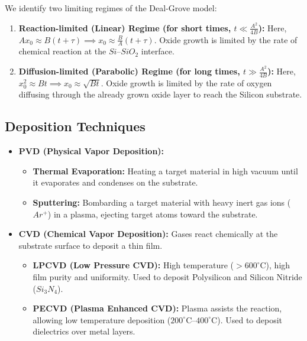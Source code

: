 \documentclass[12pt,a4paper]{article}
\begin{document}
We identify two limiting regimes of the Deal-Grove model:
\begin{enumerate}[leftmargin=*, label=\arabic*., itemsep=3.5pt]
  \item \textbf{Reaction-limited (Linear) Regime (for short times, $t \ll \frac{A^2}{4B}$):}
  Here, $A x_0 \approx B(t + \tau) \implies x_0 \approx \frac{B}{A}(t + \tau)$.
  Oxide growth is limited by the rate of chemical reaction at the $Si$--$SiO_2$ interface.
  \item \textbf{Diffusion-limited (Parabolic) Regime (for long times, $t \gg \frac{A^2}{4B}$):}
  Here, $x_0^2 \approx B t \implies x_0 \approx \sqrt{B t}$.
  Oxide growth is limited by the rate of oxygen diffusing through the already grown oxide layer to reach the Silicon substrate.
\end{enumerate}

\subsection{Deposition Techniques}
\begin{itemize}[leftmargin=*, itemsep=4pt]
  \item \textbf{PVD (Physical Vapor Deposition):}
    \begin{itemize}[leftmargin=*, itemsep=2pt]
      \item \textbf{Thermal Evaporation:} Heating a target material in high vacuum until it evaporates and condenses on the substrate.
      \item \textbf{Sputtering:} Bombarding a target material with heavy inert gas ions ($Ar^+$) in a plasma, ejecting target atoms toward the substrate.
    \end{itemize}
  \item \textbf{CVD (Chemical Vapor Deposition):} Gases react chemically at the substrate surface to deposit a thin film.
    \begin{itemize}[leftmargin=*, itemsep=2pt]
      \item \textbf{LPCVD (Low Pressure CVD):} High temperature ($> 600^{\circ}\text{C}$), high film purity and uniformity. Used to deposit Polysilicon and Silicon Nitride ($Si_3N_4$).
      \item \textbf{PECVD (Plasma Enhanced CVD):} Plasma assists the reaction, allowing low temperature deposition ($200^{\circ}\text{C}$--$400^{\circ}\text{C}$). Used to deposit dielectrics over metal layers.
    \end{itemize}
\end{itemize}
\end{document}
